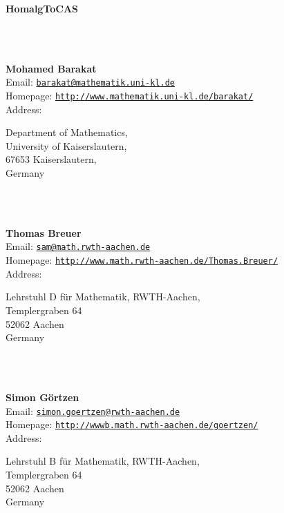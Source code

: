 \documentclass[a4paper,11pt]{report}
\newcommand{\maintitlesize}{\fontsize{50}{55}\selectfont}
\begin{document}
\begin{titlepage}
\begin{center}{\maintitlesize \textbf{\textsf{HomalgToCAS}\mbox{}}}
\end{center}\vfill

\mbox{}\\
{\mbox{}\\
\small \noindent \textbf{Mohamed Barakat\\
    }  Email: \href{mailto://barakat@mathematik.uni-kl.de} {\texttt{barakat@mathematik.uni-kl.de}}\\
  Homepage: \href{http://www.mathematik.uni-kl.de/~barakat/} {\texttt{http://www.mathematik.uni-kl.de/\texttt{}barakat/}}\\
  Address: \begin{minipage}[t]{8cm}\noindent
 Department of Mathematics, \\
 University of Kaiserslautern, \\
 67653 Kaiserslautern, \\
 Germany \end{minipage}
}\\
{\mbox{}\\
\small \noindent \textbf{Thomas Breuer\\
    }  Email: \href{mailto://sam@math.rwth-aachen.de} {\texttt{sam@math.rwth-aachen.de}}\\
  Homepage: \href{http://www.math.rwth-aachen.de/~Thomas.Breuer/} {\texttt{http://www.math.rwth-aachen.de/\texttt{}Thomas.Breuer/}}\\
  Address: \begin{minipage}[t]{8cm}\noindent
 Lehrstuhl D f{\"u}r Mathematik, RWTH-Aachen,\\
 Templergraben 64\\
 52062 Aachen\\
 Germany \end{minipage}
}\\
{\mbox{}\\
\small \noindent \textbf{Simon G{\"o}rtzen\\
    }  Email: \href{mailto://simon.goertzen@rwth-aachen.de} {\texttt{simon.goertzen@rwth-aachen.de}}\\
  Homepage: \href{http://wwwb.math.rwth-aachen.de/goertzen/} {\texttt{http://wwwb.math.rwth-aachen.de/goertzen/}}\\
  Address: \begin{minipage}[t]{8cm}\noindent
 Lehrstuhl B f{\"u}r Mathematik, RWTH-Aachen,\\
 Templergraben 64\\
 52062 Aachen\\
 Germany \end{minipage}
}
\end{titlepage}
\end{document}
